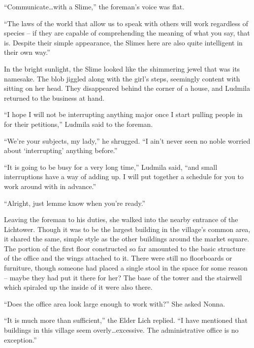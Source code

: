  

“Communicate…with a Slime,” the foreman’s voice was flat.

 

“The laws of the world that allow us to speak with others will work regardless of species – if they are capable of comprehending the meaning of what you say, that is. Despite their simple appearance, the Slimes here are also quite intelligent in their own way.”

 

In the bright sunlight, the Slime looked like the shimmering jewel that was its namesake. The blob jiggled along with the girl’s steps, seemingly content with sitting on her head. They disappeared behind the corner of a house, and Ludmila returned to the business at hand.

 

“I hope I will not be interrupting anything major once I start pulling people in for their petitions,” Ludmila said to the foreman.

 

“We’re your subjects, my lady,” he shrugged. “I ain’t never seen no noble worried about ‘interrupting’ anything before.”

 

“It is going to be busy for a very long time,” Ludmila said, “and small interruptions have a way of adding up. I will put together a schedule for you to work around with in advance.”

 

“Alright, just lemme know when you’re ready.”

 

Leaving the foreman to his duties, she walked into the nearby entrance of the Lichtower. Though it was to be the largest building in the village’s common area, it shared the same, simple style as the other buildings around the market square. The portion of the first floor constructed so far amounted to the basic structure of the office and the wings attached to it. There were still no floorboards or furniture, though someone had placed a single stool in the space for some reason – maybe they had put it there for her? The base of the tower and the stairwell which spiraled up the inside of it were also there.

 

“Does the office area look large enough to work with?” She asked Nonna.

 

“It is much more than sufficient,” the Elder Lich replied. “I have mentioned that buildings in this village seem overly…excessive. The administrative office is no exception.”

